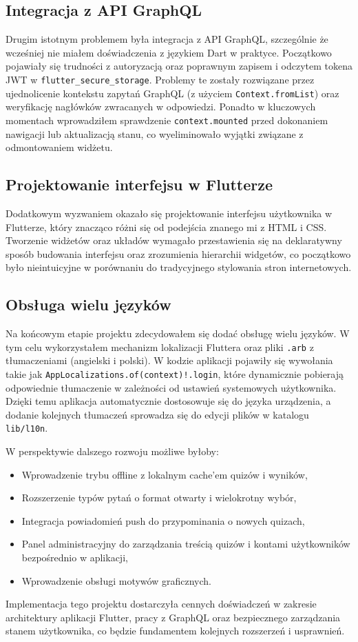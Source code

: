 \documentclass{article}
\begin{document}
	\subsection*{Integracja z API GraphQL}
	Drugim istotnym problemem była integracja z API GraphQL, szczególnie że wcześniej nie miałem doświadczenia z językiem Dart w praktyce. Początkowo pojawiały się trudności z autoryzacją oraz poprawnym zapisem i odczytem tokena JWT w \texttt{flutter\_secure\_storage}. Problemy te zostały rozwiązane przez ujednolicenie kontekstu zapytań GraphQL (z użyciem \texttt{Context.fromList}) oraz weryfikację nagłówków zwracanych w odpowiedzi. Ponadto w kluczowych momentach wprowadziłem sprawdzenie \texttt{context.mounted} przed dokonaniem nawigacji lub aktualizacją stanu, co wyeliminowało wyjątki związane z odmontowaniem widżetu.
	
	\subsection*{Projektowanie interfejsu w Flutterze}
	Dodatkowym wyzwaniem okazało się projektowanie interfejsu użytkownika w Flutterze, który znacząco różni się od podejścia znanego mi z HTML i CSS. Tworzenie widżetów oraz układów wymagało przestawienia się na deklaratywny sposób budowania interfejsu oraz zrozumienia hierarchii widgetów, co początkowo było nieintuicyjne w porównaniu do tradycyjnego stylowania stron internetowych.
	
	\subsection*{Obsługa wielu języków}
	Na końcowym etapie projektu zdecydowałem się dodać obsługę wielu języków. W tym celu wykorzystałem mechanizm lokalizacji Fluttera oraz pliki \texttt{.arb} z tłumaczeniami (angielski i polski). W kodzie aplikacji pojawiły się wywołania takie jak \texttt{AppLocalizations.of(context)!.login}, które dynamicznie pobierają odpowiednie tłumaczenie w zależności od ustawień systemowych użytkownika. Dzięki temu aplikacja automatycznie dostosowuje się do języka urządzenia, a dodanie kolejnych tłumaczeń sprowadza się do edycji plików w katalogu \texttt{lib/l10n}.

W perspektywie dalszego rozwoju możliwe byłoby:
\begin{itemize}
  \item Wprowadzenie trybu offline z lokalnym cache’em quizów i wyników,
  \item Rozszerzenie typów pytań o format otwarty i wielokrotny wybór,
  \item Integracja powiadomień push do przypominania o nowych quizach,
  \item Panel administracyjny do zarządzania treścią quizów i kontami użytkowników bezpośrednio w aplikacji,
  \item Wprowadzenie obsługi motywów graficznych.
\end{itemize}

Implementacja tego projektu dostarczyła cennych doświadczeń w zakresie architektury aplikacji Flutter, pracy z GraphQL oraz bezpiecznego zarządzania stanem użytkownika, co będzie fundamentem kolejnych rozszerzeń i usprawnień.
\end{document}
